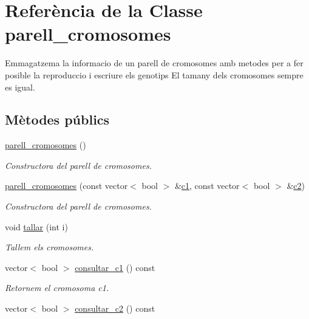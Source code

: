 \hypertarget{classparell__cromosomes}{}\section{Referència de la Classe parell\+\_\+cromosomes}
\label{classparell__cromosomes}


Emmagatzema la informacio de un parell de cromosomes amb metodes per a fer posible la reproduccio i escriure els genotips El tamany dels cromosomes sempre es igual.  


\subsection*{Mètodes públics}
\begin{DoxyCompactItemize}
\item 
\hyperlink{classparell__cromosomes_a9d86452d029f65ccf80c8861c4914698}{parell\+\_\+cromosomes} ()
\begin{DoxyCompactList}\small\item\em Constructora del parell de cromosomes. \end{DoxyCompactList}\item 
\hyperlink{classparell__cromosomes_aa7f0798619677ef4715f2d94ecd39769}{parell\+\_\+cromosomes} (const vector$<$ bool $>$ \&\hyperlink{classparell__cromosomes_ab4d7cfc40f53a1698b4ea3ef1f2cd199}{c1}, const vector$<$ bool $>$ \&\hyperlink{classparell__cromosomes_a888f09ecbc3329b0ee505fb0cb8bf98f}{c2})
\begin{DoxyCompactList}\small\item\em Constructora del parell de cromosomes. \end{DoxyCompactList}\item 
void \hyperlink{classparell__cromosomes_a3192f21452f2885d61032eb547cb4a15}{tallar} (int i)
\begin{DoxyCompactList}\small\item\em Tallem els cromosomes. \end{DoxyCompactList}\item 
vector$<$ bool $>$ \hyperlink{classparell__cromosomes_a25cf02baa8f399adc798289773729b5e}{consultar\+\_\+c1} () const 
\begin{DoxyCompactList}\small\item\em Retornem el cromosoma c1. \end{DoxyCompactList}\item 
vector$<$ bool $>$ \hyperlink{classparell__cromosomes_a4c29928abe72237272e5e1e219dc3e9d}{consultar\+\_\+c2} () const 

\end{DoxyCompactItemize}

